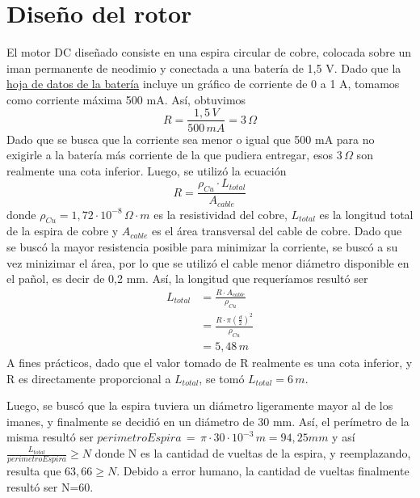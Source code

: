 \documentclass{article}
\begin{document}
\section{Diseño del rotor}
El motor DC diseñado consiste en una espira circular de cobre, colocada sobre un iman permanente de neodimio
 y conectada a una batería de 1,5 V. Dado que la  \href{https://www.bto.pl/pdf/10681/MAX-EU-D_eng_tds.pdf}{hoja de datos de la batería} 
 incluye un gráfico de corriente de 0 a 1 A, tomamos como corriente máxima 500 mA. Así, obtuvimos
\begin{equation*}
    R = \frac{1,5 \, V}{500 \, mA} = 3 \, \Omega
\end{equation*}
Dado que se busca que la corriente sea menor o igual que 500 mA para no exigirle a la batería más corriente
 de la que pudiera entregar, esos $ 3 \, \Omega $ son realmente una cota inferior. Luego, se utilizó la ecuación
\begin{equation*}
    R = \frac{\rho_{Cu} \cdot L_{total}}{A_{cable}}
\end{equation*}
donde $\rho_{Cu}=1,72\cdot 10^{-8} \, \Omega\cdot m$ es la resistividad del cobre, $L_{total}$ es la longitud
total de la espira de cobre y $A_{cable}$ es el área transversal del cable de cobre. Dado que se buscó la 
mayor resistencia posible para minimizar la corriente, se buscó a su vez minizimar el área, por lo que se 
utilizó el cable menor diámetro disponible en el pañol, es decir de 0,2 mm. Así, la longitud que requeríamos
resultó ser 
\begin{align*}
    L_{total} &=\frac{R \cdot A_{cable}}{\rho_{Cu}} \\
              &= \frac{R \cdot \pi \left( \frac{d}{2} \right)^2}{\rho_{Cu}} \\
              &= 5,48 \, m
\end{align*}
A fines prácticos, dado que el valor tomado de R realmente es una cota inferior, y R es directamente 
proporcional a $L_{total}$, se tomó $L_{total} = 6 \, m$.
\par Luego, se buscó que la espira tuviera un diámetro ligeramente mayor al de los imanes, y finalmente se 
decidió en un diámetro de 30 mm. Así, el perímetro de la misma resultó ser
$perimetroEspira \, = \, \pi \cdot 30\cdot 10^{-3} \, m = 94,25 mm$ y así $\frac{L_{total}}{perimetroEspira} \geq N$
donde N es la cantidad de vueltas de la espira, y reemplazando, resulta que $63,66 \geq N$. Debido a error
humano, la cantidad de vueltas finalmente resultó ser N=60.
\end{document}
